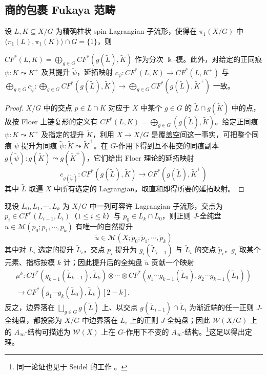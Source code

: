 \subsection{商的包裹 Fukaya 范畴}
    设 $L,K\subseteq X/G$ 为精确柱状 spin Lagrangian 子流形，使得在 $\pi_1 (X/G)$ 中 $\langle\pi_1 (L),\pi_1 (K)\rangle\cap G= \{1\}$，则
\begin{prp}
    $CF^{\ast} (L,K) =\displaystyle\bigoplus_{g\in G} CF^{\ast} (g(\tilde{L}),\tilde{K})$ 作为分次 $\Bbbk$-模。此外，对给定的正同痕 $\psi\colon K\leadsto K^+$ 及其提升 $\tilde{\psi}$，延拓映射 $c_{\psi}\colon CF^{\ast} (L,K)\to CF^{\ast} (L,K^+)$ 与 $\displaystyle\bigoplus_{g\in G} c_{\tilde{\psi}}\colon \bigoplus_{g\in G} CF^{\ast} (g(\tilde{L}),\tilde{K})\to\bigoplus_{g\in G} CF^{\ast} (g(\tilde{L}),\tilde{K}^+)$ 一致。
\end{prp}
\begin{proof}
    $X/G$ 中的交点 $p\in L\cap K$ 对应于 $X$ 中某个 $g\in G$ 的 $\tilde{L}\cap g(\tilde{K})$ 中的点，故按 Floer 上链复形的定义有 $CF^{\ast} (L,K)=\displaystyle\bigoplus_{g\in G} (g(\tilde{L}), \tilde{K})$。给定正同痕 $\psi\colon K\leadsto K^+$ 及指定的提升 $\tilde{K}$，利用 $X\to X/G$ 是覆盖空间这一事实，可把整个同痕 $\psi$ 提升为同痕 $\tilde{\psi}\colon \tilde{K}\leadsto\tilde{K}^+$。在 $G$-作用下得到互不相交的同痕副本 $g(\tilde{\psi})\colon g(\tilde{K})\leadsto g(\tilde{K}^+)$，它们给出 Floer 理论的延拓映射
\[
        c_{g(\tilde{\psi})}\colon CF^{\ast} (g(\tilde{L}),\tilde{K})\to CF^{\ast} (g(\tilde{L}),\tilde{K}^+)
\]
其中 $\tilde{L}$ 取遍 $X$ 中所有选定的 Lagrangian。取直和即得所要的延拓映射。
\end{proof}
    现设 $L_0, L_1,\dotsb ,L_k$ 为 $X/G$ 中一列可容许 Lagrangian 子流形，交点为 $p_i\in CF^{\ast} (L_{i-1}, L_i)$（$1\leq i\leq k$）与 $p_0\in L_k\cap L_0$，则正则 $J$-全纯盘 $u\in\mathcal{M} (p_0;p_1,\dotsb ,p_k)$ 有唯一的自然提升
\[
\tilde{u}\in\mathcal{M}(X;\tilde{p}_0;\tilde{p}_1,\dotsb ,\tilde{p}_k)
\]
其中对 $L_i$ 选定的提升 $\tilde{L}_i$，交点 $p_i$ 提升为 $g_i (\tilde{L}_{i-1})$ 与 $\tilde{L}_i$ 的交点 $\tilde{p}_i$，$g_i$ 取某个元素、指标按模 $k$ 计；因此提升后的全纯盘 $\tilde{u}$ 贡献一个映射
\begin{multline*}
\mu^k\colon CF^{\ast} (g_{k-1}(\tilde{L}_{k-1}),\tilde{L}_k)\otimes\dotsb\otimes CF^{\ast} (g_1\dotsb g_{k-1}(\tilde{L}_0),g_2\dotsb g_{k-1} (\tilde{L}_1))\\
\to CF^{\ast} (g_1\dotsb g_k (\tilde{L}_0),\tilde{L}_k)[2-k].
\end{multline*}
反之，边界落在 $\displaystyle\bigsqcup_{g\in G}g(\tilde{L})$ 上、以交点 $g(\tilde{L}_{i-1})\cap\tilde{L}_i$ 为渐近端的任一正则 $J$-全纯盘，都投影为 $X/G$ 中边界落在 $L_i$ 上的正则 $J$-全纯盘；因此 $\mathcal{W} (X/G)$ 上的 $A_{\infty}$-结构可描述为 $\mathcal{W} (X)$ 上在 $G$-作用下不变的 $A_{\infty}$-结构。\footnote{同一论证也见于 Seidel 的工作 \cite{Seidel11}。}这足以得出定理。
